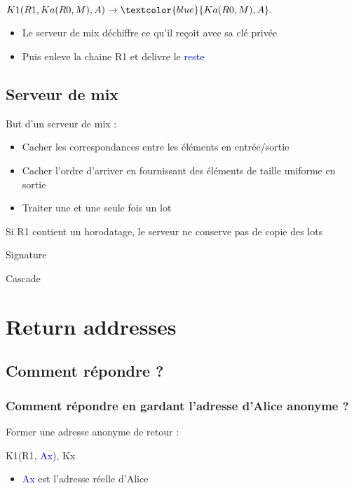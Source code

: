 \documentclass{beamer}
\begin{document}
\begin{frame}
\begin{center}
$K1( R1, Ka( R0, M ), A ) \rightarrow \textcolor{blue}{Ka( R0, M ), A}.$
\end{center}

\begin{itemize}
[triangle]
\item Le serveur de mix déchiffre ce qu'il reçoit avec sa clé privée
\item Puis enleve la chaine R1 et delivre le \textcolor{blue}{reste}
\end{itemize}
\end{frame}

\subsection{Serveur de mix}
\begin{frame}
But d'un serveur de mix :
\begin{itemize}
[triangle]
\item Cacher les correspondances entre les éléments en entrée/sortie
\item Cacher l'ordre d'arriver en fournissant des éléments de taille uniforme en sortie
\item Traiter une et une seule fois un lot
\end{itemize}
Si R1 contient un horodatage, le serveur ne conserve pas de copie des lots
\end{frame}

\begin{frame}
Signature
\end{frame}

\begin{frame}
Cascade
\end{frame}


\section{Return addresses}
\subsection{Comment répondre ?}
\begin{frame}
\frametitle{Comment répondre en gardant l'adresse d'Alice anonyme ?}
Former une adresse anonyme de retour :
\begin{center}
K1(R1, \textcolor{blue}{Ax}), Kx
\end{center}
\begin{itemize}
[triangle]
\item \textcolor{blue}{Ax} est l'adresse réelle d'Alice
\end{itemize}
\end{frame}
\end{document}
